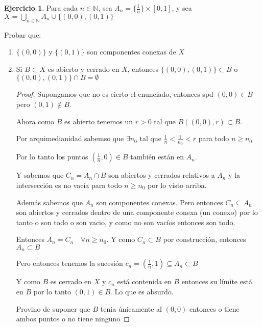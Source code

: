 \documentclass[11pt]{report}
\newcommand{\N}{\mathbb{N}}
\theoremstyle{definition}
\newtheorem{ej}{Ejercicio}
\begin{document}
\begin{ej}
	Para cada $n \in \N$, sea $A_n = \{\frac{1}{n}\} \times [0,1]$, y sea $X = \bigcup_{n\in \N} A_n \cup \{(0,0),(0,1)\}$

	Probar que:
	\begin{enumerate}
		\item $\{(0,0)\}$ y $\{(0,1)\}$ son componentes conexas de $X$
		\item Si $B \subset X$ es abierto y cerrado en $X$, entonces $\{(0,0),(0,1)\} \subset B$ o $\{(0,0),(0,1)\} \cap B = \emptyset$
			\begin{proof}
				Supongamos que no es cierto el enunciado, entonces spd $(0,0) \in B$ pero $(0,1) \notin B$.

				Ahora como $B$ es abierto tenemos un $r >0$ tal que $B((0,0),r) \subset B$.

				Por arquimedianidad sabemso que $\exists n_0$ tal que $\frac{1}{n} < \frac{1}{n_0} < r$ para todo $n \geq n_0 $

				Por lo tanto los puntos $(\frac{1}{n}, 0) \in B$ también están en $A_n$. 

				Y sabemos que $C_n = A_n \cap B $ son abiertos y cerrados relativos a $A_n$ y la intersección es no vacía para todo $n \geq n_0$ por lo visto arriba.

				Además sabemos que $A_n$ son componentes conexas. Pero entonces $C_n \subseteq A_n$ son abiertos y cerrados dentro de una componente conexa (un conexo) por lo tanto o son todo o son vacio, y como no son vacíos entonces son todo.

				Entonces $A_n = C_n \quad \forall n \geq n_0$. Y como $C_n \subset B$ por construcción, entonces $A_n \subset B$ 

				Pero entonces tenemos la sucesión $c_n = (\frac{1}{n},1) \subseteq A_n \subset B$

				Y como $B$ es cerrado en $X$ y $c_n$ está contenida en $B$ entonces su límite está en $B$ por lo tanto $(0,1) \in B$. Lo que es absurdo. 

				Provino de suponer que $B$ tenía únicamente al $(0,0)$ entonces o tiene ambos puntos o no tiene ninguno
			\end{proof}
	\end{enumerate}
\end{ej}
\end{document}
